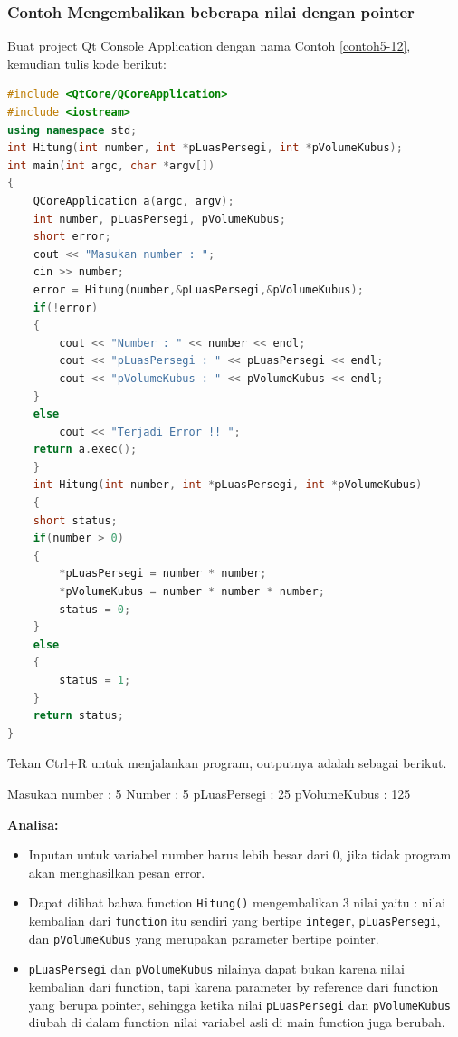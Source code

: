 \subsubsection*{Contoh  Mengembalikan beberapa nilai dengan pointer}

Buat project Qt Console Application dengan nama Contoh \ref{contoh5-12}, kemudian
tulis kode berikut:

\begin{lstlisting}[language=c++, caption=Mengembalikan beberapa nilai dengan pointer, label=contoh5-12]
#include <QtCore/QCoreApplication>
#include <iostream>
using namespace std;
int Hitung(int number, int *pLuasPersegi, int *pVolumeKubus);
int main(int argc, char *argv[])
{
    QCoreApplication a(argc, argv);
    int number, pLuasPersegi, pVolumeKubus;
    short error;
    cout << "Masukan number : ";
    cin >> number;
    error = Hitung(number,&pLuasPersegi,&pVolumeKubus);
    if(!error)
    {
        cout << "Number : " << number << endl;
        cout << "pLuasPersegi : " << pLuasPersegi << endl;
        cout << "pVolumeKubus : " << pVolumeKubus << endl;
    }
    else
        cout << "Terjadi Error !! ";
    return a.exec();
    }
    int Hitung(int number, int *pLuasPersegi, int *pVolumeKubus)
    {
    short status;
    if(number > 0)
    {
        *pLuasPersegi = number * number;
        *pVolumeKubus = number * number * number;
        status = 0;
    }
    else
    {
        status = 1;
    }
    return status;
}
\end{lstlisting}

Tekan Ctrl+R untuk menjalankan program, outputnya adalah sebagai
berikut.

\begin{lcverbatim}
Masukan number : 5
Number : 5
pLuasPersegi : 25
pVolumeKubus : 125
\end{lcverbatim}

\textbf{Analisa:}

\begin{itemize}

\item
  Inputan untuk variabel number harus lebih besar dari 0, jika tidak
  program akan menghasilkan pesan error.
\item
  Dapat dilihat bahwa function \texttt{Hitung()} mengembalikan 3 nilai
  yaitu : nilai kembalian dari \texttt{function} itu sendiri yang
  bertipe \texttt{integer}, \texttt{pLuasPersegi}, dan
  \texttt{pVolumeKubus} yang merupakan parameter bertipe pointer.
\item
  \texttt{pLuasPersegi} dan \texttt{pVolumeKubus} nilainya dapat bukan
  karena nilai kembalian dari function, tapi karena parameter by
  reference dari function yang berupa pointer, sehingga ketika nilai
  \texttt{pLuasPersegi} dan \texttt{pVolumeKubus} diubah di dalam
  function nilai variabel asli di main function juga berubah.
\end{itemize}

